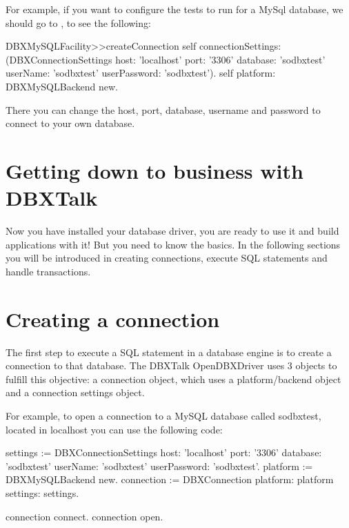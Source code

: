 \documentclass[a4paper,10pt,twoside]{book}
\begin{document}
For example, if you want to configure the tests to run for a MySql database, we should go to , to see the following:

\begin{code}{}
DBXMySQLFacility>>createConnection
    self connectionSettings: (DBXConnectionSettings
			    host: 'localhost'
			    port: '3306'
			    database: 'sodbxtest'
			    userName: 'sodbxtest'
			    userPassword: 'sodbxtest').
    self platform: DBXMySQLBackend new.
\end{code}

There you can change the host, port, database, username and password to connect to your own database.


\section{Getting down to business with DBXTalk}
Now you have installed your database driver, you are ready to use it and build applications with it!  But you need to know the basics.  In the following sections you will be introduced in creating connections, execute SQL statements and handle transactions.

\section{Creating a connection}
The first step to execute a SQL statement in a database engine is to create a connection to that database.  The DBXTalk OpenDBXDriver uses 3 objects to fulfill this objective: a connection object, which uses a platform/backend object and a connection settings object.

For example, to open a connection to a MySQL database called sodbxtest, located in localhost you can use the following code:

\begin{code}{}
settings := DBXConnectionSettings
                     host: 'localhost'
                     port: '3306'
                     database: 'sodbxtest'
                     userName: 'sodbxtest'
                     userPassword: 'sodbxtest'.
platform := DBXMySQLBackend new.
connection := DBXConnection platform: platform settings: settings.

connection connect.
connection open.
\end{code}
\end{document}
